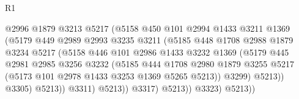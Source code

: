 \begin{lexlean}{R1}
\begin{coremodule}
                                    @2996
                                    @1879
                                    @3213
                                    @5217
                                    (@5158
                                      @450
                                      @101
                                      @2994
                                      @1433
                                      @3211
                                      @1369
                                      (@5179
                                        @449
                                        @2989
                                        @2993
                                        @3235
                                        @3211
                                        (@5185
                                          @448
                                          @1708
                                          @2988
                                          @1879
                                          @3234
                                          @5217
                                          (@5158
                                            @446
                                            @101
                                            @2986
                                            @1433
                                            @3232
                                            @1369
                                            (@5179
                                              @445
                                              @2981
                                              @2985
                                              @3256
                                              @3232
                                              (@5185
                                                @444
                                                @1708
                                                @2980
                                                @1879
                                                @3255
                                                @5217
                                                (@5173 @101 @2978 @1433 @3253 @1369 @5265 @5213))
                                              @3299)
                                            @5213))
                                        @3305)
                                      @5213))
                                  @3311)
                                @5213))
                            @3317)
                          @5213))
                      @3323)
                    @5213))

\end{coremodule}
\end{lexlean}
